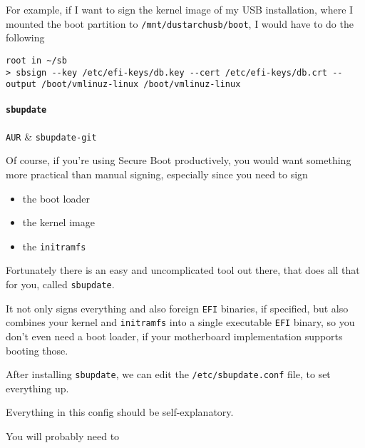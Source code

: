 \documentclass[10pt]{dustdoc}
\begin{document}
For example, if I want to sign the kernel image of my USB installation, where I mounted the boot partition to \texttt{/mnt/dustarchusb/boot}, I would have to do the following

\begin{verbatim}
root in ~/sb
> sbsign --key /etc/efi-keys/db.key --cert /etc/efi-keys/db.crt --output /boot/vmlinuz-linux /boot/vmlinuz-linux
\end{verbatim}

\paragraph{\texttt{sbupdate}}%
\label{par:sbupdate}

\begin{pkgtable}
    \texttt{AUR} & \texttt{sbupdate-git} \\
\end{pkgtable}

Of course, if you’re using Secure Boot productively, you would want something more practical than manual signing, especially since you need to sign

\begin{itemize}
    \item the boot loader

    \item the kernel image

    \item the \texttt{initramfs}
\end{itemize}

Fortunately there is an easy and uncomplicated tool out there, that does all that for you, called \texttt{sbupdate}.

It not only signs everything and also foreign \texttt{EFI} binaries, if specified, but also combines your kernel and \texttt{initramfs} into a single executable \texttt{EFI} binary, so you don’t even need a boot loader, if your motherboard implementation supports booting those.

After installing \texttt{sbupdate}, we can edit the \texttt{/etc/sbupdate.conf} file, to set everything up.

Everything in this config should be self-explanatory.

You will probably need to
\end{document}
